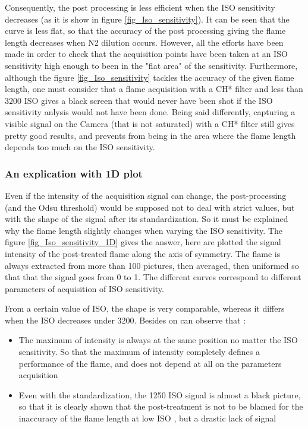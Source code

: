 Consequently, the post processing is less efficient when the ISO sensitivity decreases (as it is show in figure \ref{fig_Iso_sensitivity}). It can be seen that the curve is less flat, so that the accuracy of the post processing giving the flame length decreases when N2 dilution occurs. However, all the efforts have been made in order to check that the acquisition points have been taken at an ISO sensitivity high enough to been in the "flat area" of the sensitivity. Furthermore, although the figure \ref{fig_Iso_sensitivity} tackles the accuracy of the given flame length, one must consider that a flame acquisition with a CH* filter and less than 3200 ISO gives a black screen that would never have been shot if the ISO sensitivity anlysis would not have been done. Being said differently, capturing a visible signal on the Camera (that is not saturated) with a CH* filter still gives pretty good results, and prevents from being in the area where the flame length depends too much on the ISO sensitivity.

\subsubsection{An explication with 1D plot}
Even if the intensity of the acquisition signal can change, the post-processing (and the Odsu threshold) would be supposed not to deal with strict values, but with the shape of the signal after its standardization. So it must be explained why the flame length slightly changes when varying the ISO sensitivity. The figure \ref{fig_Iso_sensitivity_1D} gives the answer, here are plotted the signal intensity of the post-treated flame along the axis of symmetry. The flame is always extracted from more than 100 pictures, then averaged, then uniformed so that that the signal goes from 0 to 1. The different curves correspond to different parameters of acquisition of ISO sensitivity.

From a certain value of ISO, the shape is very comparable, whereas it differs when the ISO decreases under 3200. Besides on can observe that :
\begin{itemize}
\item The maximum of intensity is always at the same position no matter the ISO sensitivity. So that the maximum of intensity completely defines a performance of the flame, and does not depend at all on the parameters acquisition
\item Even with the standardization, the 1250 ISO signal is almost a black picture, so that it is clearly shown that the post-treatment is not to be blamed for  the inaccuracy of the flame length at low ISO , but a drastic lack of signal
\end{itemize}




